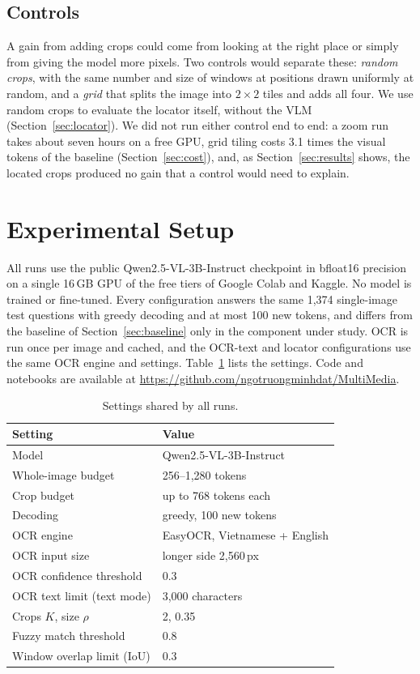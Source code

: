 \documentclass[conference]{IEEEtran}
\begin{document}
\subsection{Controls}
\label{sec:controls}
A gain from adding crops could come from looking at the right place or simply from giving the model more pixels. Two controls would separate these: \emph{random crops}, with the same number and size of windows at positions drawn uniformly at random, and a \emph{grid} that splits the image into $2 \times 2$ tiles and adds all four. We use random crops to evaluate the locator itself, without the VLM (Section~\ref{sec:locator}). We did not run either control end to end: a zoom run takes about seven hours on a free GPU, grid tiling costs 3.1 times the visual tokens of the baseline (Section~\ref{sec:cost}), and, as Section~\ref{sec:results} shows, the located crops produced no gain that a control would need to explain.

\section{Experimental Setup}
All runs use the public Qwen2.5-VL-3B-Instruct checkpoint in bfloat16 precision on a single 16\,GB GPU of the free tiers of Google Colab and Kaggle. No model is trained or fine-tuned. Every configuration answers the same 1{,}374 single-image test questions with greedy decoding and at most 100 new tokens, and differs from the baseline of Section~\ref{sec:baseline} only in the component under study. OCR is run once per image and cached, and the OCR-text and locator configurations use the same OCR engine and settings. Table~\ref{tab:setup} lists the settings. Code and notebooks are available at \url{https://github.com/ngotruongminhdat/MultiMedia}.

\begin{table}[t]
\caption{Settings shared by all runs.}
\label{tab:setup}
\centering
\begin{tabular}{ll}
\toprule
Setting & Value \\
\midrule
Model & Qwen2.5-VL-3B-Instruct \\
Whole-image budget & 256--1{,}280 tokens \\
Crop budget & up to 768 tokens each \\
Decoding & greedy, 100 new tokens \\
OCR engine & EasyOCR, Vietnamese + English \\
OCR input size & longer side 2{,}560\,px \\
OCR confidence threshold & 0.3 \\
OCR text limit (text mode) & 3{,}000 characters \\
Crops $K$, size $\rho$ & 2, 0.35 \\
Fuzzy match threshold & 0.8 \\
Window overlap limit (IoU) & 0.3 \\
\bottomrule
\end{tabular}
\end{table}
\end{document}
